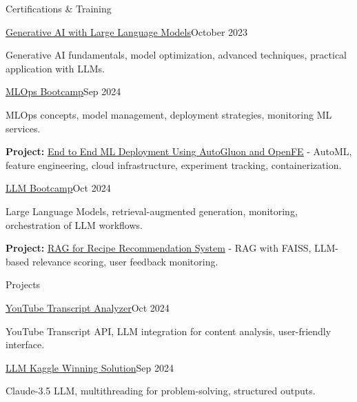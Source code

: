 \documentclass{resume} %
\begin{document}
\begin{rSection}{Certifications \& Training}
            \begin{rSubsection}
            {\href{https://coursera.org/share/9459a80d6710c6beebe8355a73b52368}{Generative AI with Large Language Models}}{October 2023}
            {}{}
            \item Generative AI fundamentals, model optimization, advanced techniques, practical application with LLMs.
                    \end{rSubsection}
            \begin{rSubsection}
            {\href{https://certificate.datatalks.club/mlops-zoomcamp/2024/55db812d19a5b355790d127cb88ca72afdc49df5.pdf}{MLOps Bootcamp}}{Sep 2024}
            {}{}
            \item MLOps concepts, model management, deployment strategies, monitoring ML services.
                            \item \textbf{Project:} \href{https://github.com/ArturGR3/MLOps-project}{End to End ML Deployment Using AutoGluon and OpenFE} - AutoML, feature engineering, cloud infrastructure, experiment tracking, containerization.
                    \end{rSubsection}
            \begin{rSubsection}
            {\href{https://certificate.datatalks.club/llm-zoomcamp/2024/55db812d19a5b355790d127cb88ca72afdc49df5.pdf}{LLM Bootcamp}}{Oct 2024}
            {}{}
            \item Large Language Models, retrieval-augmented generation, monitoring, orchestration of LLM workflows.
                            \item \textbf{Project:} \href{https://github.com/ArturGR3/food_search_RAG}{RAG for Recipe Recommendation System} - RAG with FAISS, LLM-based relevance scoring, user feedback monitoring.
                    \end{rSubsection}
    \end{rSection}

\begin{rSection}{Projects}
            \begin{rSubsection}
            {\href{https://github.com/ArturGR3/Youtube-transcript-Q-A}{YouTube Transcript Analyzer}}{Oct 2024}{}{}
            \item YouTube Transcript API, LLM integration for content analysis, user-friendly interface.
        \end{rSubsection}
            \begin{rSubsection}
            {\href{https://github.com/ArturGR3/LLM-kaggle-competition}{LLM Kaggle Winning Solution}}{Sep 2024}{}{}
            \item Claude-3.5 LLM, multithreading for problem-solving, structured outputs.
        \end{rSubsection}
    \end{rSection}
\end{document}
